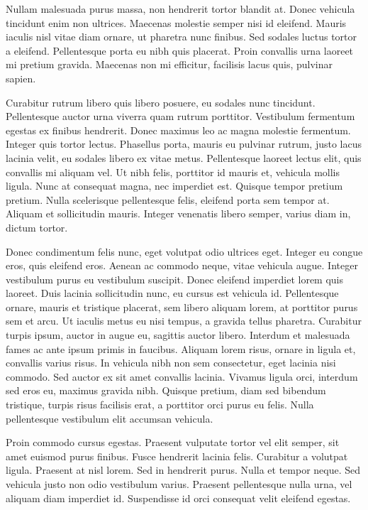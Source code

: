 \documentclass[10pt,twocolumn]{revtex4-2}    %
\begin{document}
Nullam malesuada purus massa, non hendrerit tortor blandit at. Donec vehicula tincidunt enim non ultrices. Maecenas molestie semper nisi id eleifend. Mauris iaculis nisl vitae diam ornare, ut pharetra nunc finibus. Sed sodales luctus tortor a eleifend. Pellentesque porta eu nibh quis placerat. Proin convallis urna laoreet mi pretium gravida. Maecenas non mi efficitur, facilisis lacus quis, pulvinar sapien.

Curabitur rutrum libero quis libero posuere, eu sodales nunc tincidunt. Pellentesque auctor urna viverra quam rutrum porttitor. Vestibulum fermentum egestas ex finibus hendrerit. Donec maximus leo ac magna molestie fermentum. Integer quis tortor lectus. Phasellus porta, mauris eu pulvinar rutrum, justo lacus lacinia velit, eu sodales libero ex vitae metus. Pellentesque laoreet lectus elit, quis convallis mi aliquam vel. Ut nibh felis, porttitor id mauris et, vehicula mollis ligula. Nunc at consequat magna, nec imperdiet est. Quisque tempor pretium pretium. Nulla scelerisque pellentesque felis, eleifend porta sem tempor at. Aliquam et sollicitudin mauris. Integer venenatis libero semper, varius diam in, dictum tortor.

Donec condimentum felis nunc, eget volutpat odio ultrices eget. Integer eu congue eros, quis eleifend eros. Aenean ac commodo neque, vitae vehicula augue. Integer vestibulum purus eu vestibulum suscipit. Donec eleifend imperdiet lorem quis laoreet. Duis lacinia sollicitudin nunc, eu cursus est vehicula id. Pellentesque ornare, mauris et tristique placerat, sem libero aliquam lorem, at porttitor purus sem et arcu. Ut iaculis metus eu nisi tempus, a gravida tellus pharetra. Curabitur turpis ipsum, auctor in augue eu, sagittis auctor libero. Interdum et malesuada fames ac ante ipsum primis in faucibus. Aliquam lorem risus, ornare in ligula et, convallis varius risus. In vehicula nibh non sem consectetur, eget lacinia nisi commodo. Sed auctor ex sit amet convallis lacinia. Vivamus ligula orci, interdum sed eros eu, maximus gravida nibh. Quisque pretium, diam sed bibendum tristique, turpis risus facilisis erat, a porttitor orci purus eu felis. Nulla pellentesque vestibulum elit accumsan vehicula.

Proin commodo cursus egestas. Praesent vulputate tortor vel elit semper, sit amet euismod purus finibus. Fusce hendrerit lacinia felis. Curabitur a volutpat ligula. Praesent at nisl lorem. Sed in hendrerit purus. Nulla et tempor neque. Sed vehicula justo non odio vestibulum varius. Praesent pellentesque nulla urna, vel aliquam diam imperdiet id. Suspendisse id orci consequat velit eleifend egestas.
\end{document}
